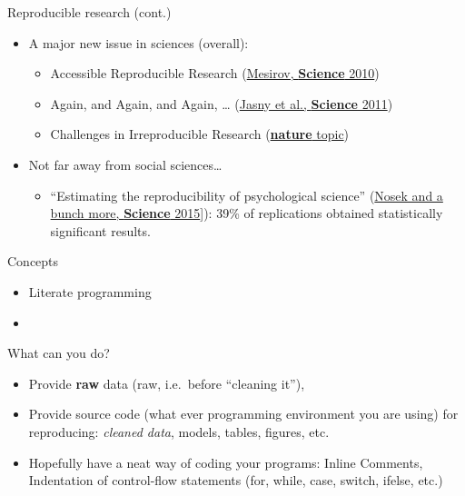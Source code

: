 \begin{frame}{Reproducible research (cont.)}

\begin{itemize}
\tightlist
\item
  A major new issue in sciences (overall):

  \begin{itemize}
  \tightlist
  \item
    Accessible Reproducible Research
    (\href{http://science.sciencemag.org/content/327/5964/415}{Mesirov,
    \textbf{Science} 2010})
  \item
    Again, and Again, and Again, \ldots{}
    (\href{http://science.sciencemag.org/content/334/6060/1225}{Jasny et
    al., \textbf{Science} 2011})
  \item
    Challenges in Irreproducible Research
    (\href{http://www.nature.com/news/reproducibility-1.17552}{\textbf{nature}
    topic})
  \end{itemize}
\item
  Not far away from social sciences\ldots{}

  \begin{itemize}
  \tightlist
  \item
    ``Estimating the reproducibility of psychological science''
    (\href{http://science.sciencemag.org/content/349/6251/aac4716}{Nosek
    and a bunch more, \textbf{Science} 2015}{]}): 39\% of replications
    obtained statistically significant results.
  \end{itemize}
\end{itemize}

\end{frame}

\begin{frame}{Concepts}

\begin{itemize}
\item
  Literate programming
\item
\end{itemize}

\end{frame}

\begin{frame}{What can you do?}

\begin{itemize}
\tightlist
\item
  Provide \textbf{raw} data (raw, i.e.~before ``cleaning it''),
\item
  Provide source code (what ever programming environment you are using)
  for reproducing: \emph{cleaned data}, models, tables, figures, etc.
\item
  Hopefully have a neat way of coding your programs: Inline Comments,
  Indentation of control-flow statements (for, while, case, switch,
  ifelse, etc.)
\end{itemize}

\end{frame}

